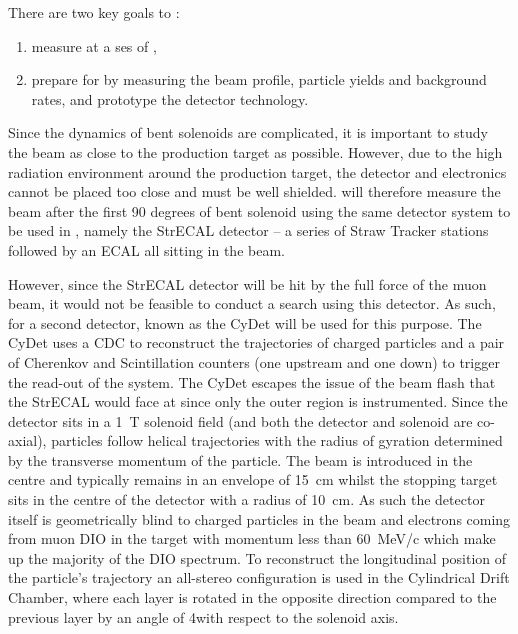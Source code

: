 There are two key goals to \phaseI:
\begin{enumerate}
	\item measure \mueconv at a \acf{ses} of \sensePI,
\item prepare for \phaseII by measuring the beam profile, particle yields and background rates, and prototype the detector technology.
\end{enumerate}
Since the dynamics of bent solenoids are complicated, it is important to study the beam as close to the production target as possible.
However, due to the high radiation environment around the production target, the detector and electronics cannot be placed too close and must be well shielded.
\phaseI will therefore measure the beam after the first 90 degrees of bent solenoid using the same detector system to be used in \phaseII, namely the \ac{StrECAL} detector -- a series of Straw Tracker stations  followed by an ECAL
all sitting in the beam.  

However, since the StrECAL detector will be hit by the full force of the muon beam, it would not be feasible to conduct a \mueconv search using this detector.
As such, for \phaseI a second detector, known as the \ac{CyDet} will be used for this purpose.
The \ac{CyDet} uses a \ac{CDC} to reconstruct the trajectories of charged particles and a pair of Cherenkov and Scintillation counters (one upstream and one down) to trigger the read-out of the system.
The \ac{CyDet} escapes the issue of the beam flash that the \ac{StrECAL} would face at \phaseI since only the outer region is instrumented.
Since the detector sits in a 1~T solenoid field (and both the detector and solenoid are co-axial), particles follow helical trajectories with the radius of gyration determined by the transverse momentum of the particle.
The beam is introduced in the centre and typically remains in an envelope of 15~cm whilst the stopping target sits in the centre of the detector with a radius of 10~cm.
As such the detector itself is geometrically blind to charged particles in the beam and electrons coming from muon \ac{DIO} in the target with momentum less than 60~MeV/c which make up the majority of the \ac{DIO} spectrum.
To reconstruct the longitudinal position of the particle's trajectory an all-stereo configuration is used in the Cylindrical Drift Chamber, where each layer is rotated in the opposite direction compared to the previous layer by an angle of 4\degree with respect to the solenoid axis.

